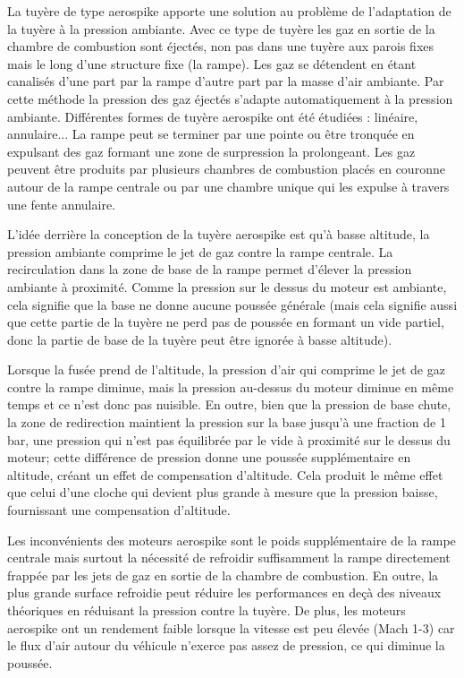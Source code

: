 \documentclass{report}
\begin{document}
La tuyère de type aerospike apporte une solution au problème de l'adaptation de la tuyère à la pression ambiante. Avec ce type de tuyère les gaz en sortie de la chambre de combustion sont éjectés, non pas dans une tuyère aux parois fixes mais le long d'une structure fixe (la rampe). Les gaz se détendent en étant canalisés d'une part par la rampe d'autre part par la masse d'air ambiante. Par cette méthode la pression des gaz éjectés s'adapte automatiquement à la pression ambiante. Différentes formes de tuyère aerospike ont été étudiées : linéaire, annulaire... La rampe peut se terminer par une pointe ou être tronquée en expulsant des gaz formant une zone de surpression la prolongeant. Les gaz peuvent être produits par plusieurs chambres de combustion placés en couronne autour de la rampe centrale ou par une chambre unique qui les expulse à travers une fente annulaire.

L'idée derrière la conception de la tuyère aerospike est qu'à basse altitude, la pression ambiante comprime le jet de gaz contre la rampe centrale. La recirculation dans la zone de base de la rampe permet d'élever la pression ambiante à proximité. Comme la pression sur le dessus du moteur est ambiante, cela signifie que la base ne donne aucune poussée générale (mais cela signifie aussi que cette partie de la tuyère ne perd pas de poussée en formant un vide partiel, donc la partie de base de la tuyère peut être ignorée à basse altitude).

Lorsque la fusée prend de l'altitude, la pression d'air qui comprime le jet de gaz contre la rampe diminue, mais la pression au-dessus du moteur diminue en même temps et ce n'est donc pas nuisible. En outre, bien que la pression de base chute, la zone de redirection maintient la pression sur la base jusqu'à une fraction de 1 bar, une pression qui n'est pas équilibrée par le vide à proximité sur le dessus du moteur; cette différence de pression donne une poussée supplémentaire en altitude, créant un effet de compensation d'altitude. Cela produit le même effet que celui d'une cloche qui devient plus grande à mesure que la pression baisse, fournissant une compensation d'altitude.

Les inconvénients des moteurs aerospike sont le poids supplémentaire de la rampe centrale mais surtout la nécessité de refroidir suffisamment la rampe directement frappée par les jets de gaz en sortie de la chambre de combustion. En outre, la plus grande surface refroidie peut réduire les performances en deçà des niveaux théoriques en réduisant la pression contre la tuyère. De plus, les moteurs aerospike ont un rendement faible lorsque la vitesse est peu élevée (Mach 1-3) car le flux d'air autour du véhicule n'exerce pas assez de pression, ce qui diminue la poussée.
\end{document}
